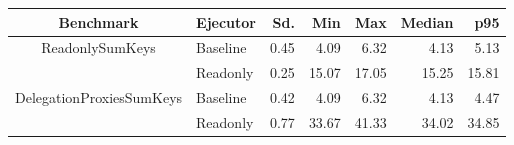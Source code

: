 \begin{center}
\begin{tabular}{ c | l r r r r r}
\toprule
\textbf{Benchmark} & \textbf{Ejecutor} & \textbf{Sd.} & \textbf{Min} & \textbf{Max} & \textbf{Median} & \textbf{p95}\\
\toprule

\multirow{2}{*}{ ReadonlySumKeys } & Baseline & 0.45 & 4.09 & 6.32 & 4.13 & 5.13 \\
& Readonly & 0.25 & 15.07 & 17.05 & 15.25 & 15.81 \\
\midrule

\multirow{2}{*}{ DelegationProxiesSumKeys } & Baseline & 0.42 & 4.09 & 6.32 & 4.13 & 4.47 \\
& Readonly & 0.77 & 33.67 & 41.33 & 34.02 & 34.85 \\
\midrule

\end{tabular}
\end{center}